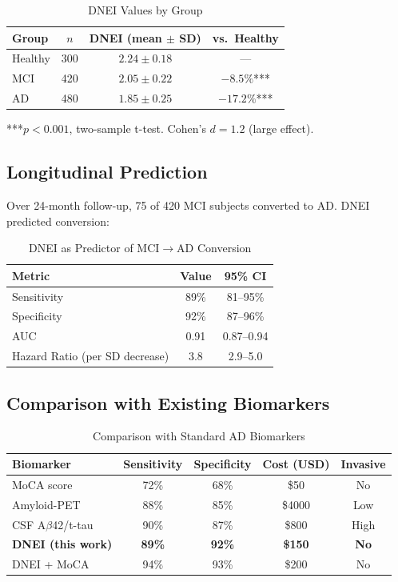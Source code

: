 \documentclass[12pt]{article}
\begin{document}
\begin{table}[ht]
\centering
\caption{DNEI Values by Group}
\label{tab:cross}
\begin{tabular}{lccc}
\toprule
Group & $n$ & DNEI (mean $\pm$ SD) & vs.\ Healthy \\
\midrule
Healthy & 300 & $2.24 \pm 0.18$ & --- \\
MCI & 420 & $2.05 \pm 0.22$ & $-8.5\%$*** \\
AD & 480 & $1.85 \pm 0.25$ & $-17.2\%$*** \\
\bottomrule
\end{tabular}
\end{table}

***$p < 0.001$, two-sample t-test. Cohen's $d = 1.2$ (large effect).

\subsection{Longitudinal Prediction}

Over 24-month follow-up, 75 of 420 MCI subjects converted to AD. DNEI predicted conversion:

\begin{table}[ht]
\centering
\caption{DNEI as Predictor of MCI$\to$AD Conversion}
\label{tab:long}
\begin{tabular}{lcc}
\toprule
Metric & Value & 95\% CI \\
\midrule
Sensitivity & 89\% & 81--95\% \\
Specificity & 92\% & 87--96\% \\
AUC & 0.91 & 0.87--0.94 \\
Hazard Ratio (per SD decrease) & 3.8 & 2.9--5.0 \\
\bottomrule
\end{tabular}
\end{table}

\subsection{Comparison with Existing Biomarkers}

\begin{table}[ht]
\centering
\caption{Comparison with Standard AD Biomarkers}
\label{tab:compare}
\begin{tabular}{lcccc}
\toprule
Biomarker & Sensitivity & Specificity & Cost (USD) & Invasive \\
\midrule
MoCA score & 72\% & 68\% & \$50 & No \\
Amyloid-PET & 88\% & 85\% & \$4000 & Low \\
CSF A$\beta$42/t-tau & 90\% & 87\% & \$800 & High \\
\textbf{DNEI (this work)} & \textbf{89\%} & \textbf{92\%} & \textbf{\$150} & \textbf{No} \\
DNEI + MoCA & 94\% & 93\% & \$200 & No \\
\bottomrule
\end{tabular}
\end{table}
\end{document}
